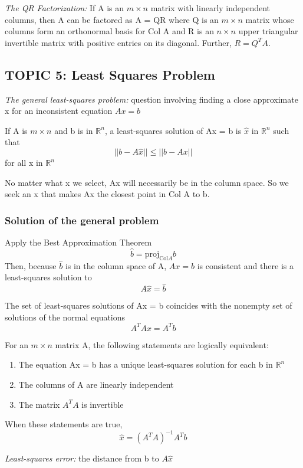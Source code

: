 \documentclass[12pt]{article} %
\newcommand{\R}{\mathbb{R}}
\begin{document}
\emph{The QR Factorization:} If A is an $m \times n$ matrix with linearly independent columns, then A can be factored as A = QR where Q is an $m \times n$ matrix whose columns form an orthonormal basis for Col A and R is an $n \times n$ upper triangular invertible matrix with positive entries on its diagonal. Further, $R= Q^T A$.

\subsection{TOPIC 5: Least Squares Problem}
\emph{The general least-squares problem:} question involving finding a close approximate x for an inconsistent equation $Ax = b$

If A is $m \times n$ and b is in $\R^n$, a least-squares solution of Ax = b is $\hat{x}$ in $\R^n$ such that 
$$||b - A\hat{x}|| \leq ||b - Ax||$$
for all x in $\R^n$

No matter what x we select, Ax will necessarily be in the column space. So we seek an x that makes Ax the closest point in Col A to b. 

\subsubsection{Solution of the general problem}
Apply the Best Approximation Theorem 
	$$\hat{b} = \text{proj}_{\text{Col} A} b$$
Then, because $\hat{b}$ is in the column space of A, $Ax = \hat{b}$ is consistent and there is a least-squares solution to
$$A\hat{x} = \hat{b}$$

The set of least-squares solutions of Ax = b coincides with the nonempty set of solutions of the normal equations 
$$A^T Ax = A^T b$$

For an $m \times n$ matrix A, the following statements are logically equivalent:
\begin{enumerate}
	\item The equation Ax = b has a unique least-squares solution for each b in $\R^n$
	\item The columns of A are linearly independent
	\item The matrix $A^T A$ is invertible
\end{enumerate}
When these statements are true, 
$$\hat{x} = (A^T A)^{-1} A^T b$$

\emph{Least-squares error:} the distance from b to $A\hat{x}$
\end{document}
